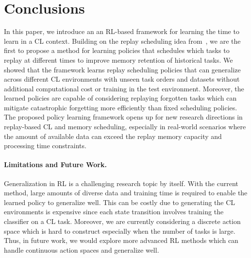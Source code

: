 
\section{Conclusions}\label{paperD:sec:conclusions}

In this paper, we introduce an an RL-based framework for learning the time to learn in a CL context. Building on the replay scheduling idea from~, we are the first to propose a method for learning policies that schedules which tasks to replay at different times to improve memory retention of historical tasks. We showed that the framework learns replay scheduling policies that can generalize across different CL environments with unseen task orders and datasets without additional computational cost or training in the test environment. Moreover, the learned policies are capable of considering replaying forgotten tasks which can mitigate catastrophic forgetting more efficiently than fixed scheduling policies. The proposed policy learning framework opens up for new research directions in replay-based CL and memory scheduling, especially in real-world scenarios where the amount of available data can exceed the replay memory capacity and processing time constraints.   

\vspace{-3mm}
\paragraph{Limitations and Future Work.} 
Generalization in RL is a challenging research topic by itself. With the current method, large amounts of diverse data and training time is required to enable the learned policy to generalize well. This can be costly due to generating the CL environments is expensive since each state transition involves training the classifier on a CL task. 
Moreover, we are currently considering a discrete action space which is hard to construct especially when the number of tasks is large. Thus, in future work, we would explore more advanced RL methods which can handle continuous action spaces and generalize well.  

